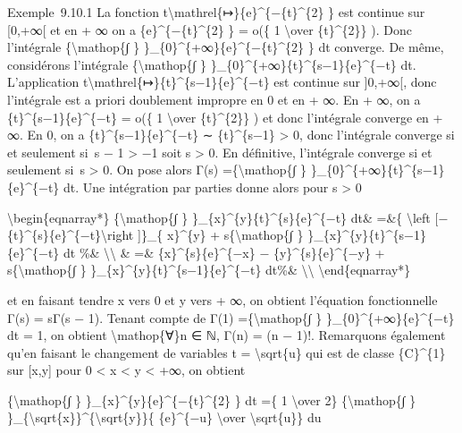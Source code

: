 \documentclass[]{article}
\begin{document}
Exemple~9.10.1 La fonction
t\textbackslash{}mathrel\{↦\}\{e\}\^{}\{−\{t\}\^{}\{2\} \} est continue
sur {[}0,+∞{[} et en + ∞ on a \{e\}\^{}\{−\{t\}\^{}\{2\} \} = o(\{ 1
\textbackslash{}over \{t\}\^{}\{2\}\} ). Donc l'intégrale
\{\textbackslash{}mathop\{∫ \}
\}\_\{0\}\^{}\{+∞\}\{e\}\^{}\{−\{t\}\^{}\{2\} \} dt converge. De même,
considérons l'intégrale \{\textbackslash{}mathop\{∫ \}
\}\_\{0\}\^{}\{+∞\}\{t\}\^{}\{s−1\}\{e\}\^{}\{−t\} dt. L'application
t\textbackslash{}mathrel\{↦\}\{t\}\^{}\{s−1\}\{e\}\^{}\{−t\} est
continue sur {]}0,+∞{[}, donc l'intégrale est a priori doublement
impropre en 0 et en + ∞. En + ∞, on a \{t\}\^{}\{s−1\}\{e\}\^{}\{−t\} =
o(\{ 1 \textbackslash{}over \{t\}\^{}\{2\}\} ) et donc l'intégrale
converge en + ∞. En 0, on a \{t\}\^{}\{s−1\}\{e\}\^{}\{−t\} ∼
\{t\}\^{}\{s−1\} \textgreater{} 0, donc l'intégrale converge si et
seulement si~s − 1 \textgreater{} −1 soit s \textgreater{} 0. En
définitive, l'intégrale converge si et seulement si~s \textgreater{} 0.
On pose alors Γ(s) =\{\textbackslash{}mathop\{∫ \}
\}\_\{0\}\^{}\{+∞\}\{t\}\^{}\{s−1\}\{e\}\^{}\{−t\} dt. Une intégration
par parties donne alors pour s \textgreater{} 0

\textbackslash{}begin\{eqnarray*\} \{\textbackslash{}mathop\{∫ \}
\}\_\{x\}\^{}\{y\}\{t\}\^{}\{s\}\{e\}\^{}\{−t\} dt\& =\&\{
\textbackslash{}left
{[}−\{t\}\^{}\{s\}\{e\}\^{}\{−t\}\textbackslash{}right {]}\}\_\{
x\}\^{}\{y\} + s\{\textbackslash{}mathop\{∫ \}
\}\_\{x\}\^{}\{y\}\{t\}\^{}\{s−1\}\{e\}\^{}\{−t\} dt \%\&
\textbackslash{}\textbackslash{} \& =\& \{x\}\^{}\{s\}\{e\}\^{}\{−x\} −
\{y\}\^{}\{s\}\{e\}\^{}\{−y\} + s\{\textbackslash{}mathop\{∫ \}
\}\_\{x\}\^{}\{y\}\{t\}\^{}\{s−1\}\{e\}\^{}\{−t\} dt\%\&
\textbackslash{}\textbackslash{} \textbackslash{}end\{eqnarray*\}

et en faisant tendre x vers 0 et y vers + ∞, on obtient l'équation
fonctionnelle Γ(s) = sΓ(s − 1). Tenant compte de Γ(1)
=\{\textbackslash{}mathop\{∫ \} \}\_\{0\}\^{}\{+∞\}\{e\}\^{}\{−t\} dt =
1, on obtient \textbackslash{}mathop\{∀\}n ∈ ℕ, Γ(n) = (n − 1)!.
Remarquons également qu'en faisant le changement de variables t =
\textbackslash{}sqrt\{u\} qui est de classe \{C\}\^{}\{1\} sur {[}x,y{]}
pour 0 \textless{} x \textless{} y \textless{} +∞, on obtient

\{\textbackslash{}mathop\{∫ \}
\}\_\{x\}\^{}\{y\}\{e\}\^{}\{−\{t\}\^{}\{2\} \} dt =\{ 1
\textbackslash{}over 2\} \{\textbackslash{}mathop\{∫ \}
\}\_\{\textbackslash{}sqrt\{x\}\}\^{}\{\textbackslash{}sqrt\{y\}\}\{
\{e\}\^{}\{−u\} \textbackslash{}over \textbackslash{}sqrt\{u\}\} du
\end{document}
